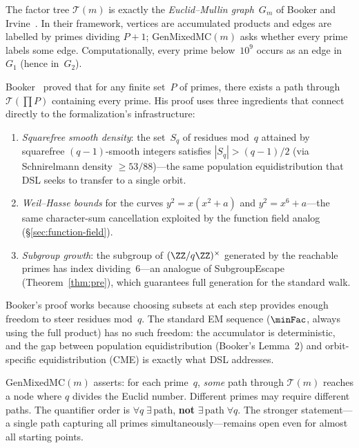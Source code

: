\begin{remark}
\label{rem:em-graph}
The factor tree $\mathcal{T}(m)$ is exactly the \emph{Euclid--Mullin
graph}~$G_m$ of Booker and Irvine~\cite{BoIr2016}.  In their
framework, vertices are accumulated products and edges are labelled by
primes dividing $P{+}1$; GenMixedMC$(m)$ asks whether every prime
labels some edge.  Computationally, every prime below~$10^9$ occurs as
an edge in~$G_1$ (hence in~$G_2$).

Booker~\cite{BoSa2012} proved that for any finite set~$P$ of primes,
there exists a path through $\mathcal{T}(\prod P)$ containing every
prime.  His proof uses three ingredients that connect directly to the
formalization's infrastructure:
\begin{enumerate}[nosep]
\item \emph{Squarefree smooth density}:
  the set~$S_q$ of residues mod~$q$ attained by squarefree
  $(q{-}1)$-smooth integers satisfies $|S_q| > (q{-}1)/2$
  (via Schnirelmann density $\geq 53/88$)---the same population
  equidistribution that DSL seeks to transfer to a single orbit.
\item \emph{Weil--Hasse bounds} for the curves $y^2 = x(x^2+a)$
  and $y^2 = x^6+a$---the same character-sum cancellation exploited
  by the function field analog (\S\ref{sec:function-field}).
\item \emph{Subgroup growth}: the subgroup of $(\ZZ/q\ZZ)^\times$
  generated by the reachable primes has index dividing~$6$---an
  analogue of SubgroupEscape (Theorem~\ref{thm:pre}), which guarantees
  full generation for the standard walk.
\end{enumerate}
Booker's proof works because choosing subsets at each step provides
enough freedom to steer residues mod~$q$.  The standard EM sequence
($\minFac$, always using the full product) has no such freedom: the
accumulator is deterministic, and the gap between population
equidistribution (Booker's Lemma~2) and orbit-specific
equidistribution (CME) is exactly what DSL addresses.
\end{remark}

\begin{remark}
\label{rem:quantifier}
GenMixedMC$(m)$ asserts: for each prime~$q$, \emph{some} path
through $\mathcal{T}(m)$ reaches a node where $q$ divides the Euclid
number.  Different primes may require different paths.  The quantifier
order is $\forall q\;\exists\,\text{path}$, \textbf{not}
$\exists\,\text{path}\;\forall q$.  The stronger statement---a single
path capturing all primes simultaneously---remains open even for
almost all starting points.
\end{remark}

